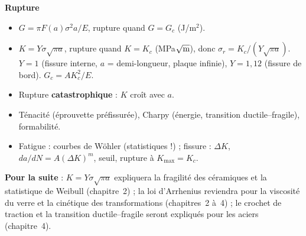 \begin{recapbox}
\textbf{Rupture}
\begin{itemize}
  \item $G = \pi F(a)\sigma^2 a/E$, rupture quand $G = G_c$ (J/m$^2$).
  \item \textbf{$K = Y\sigma\sqrt{\pi a}$}, rupture quand $K = K_c$ (MPa$\sqrt{\text m}$),
        donc $\sigma_r = K_c/(Y\sqrt{\pi a})$. $Y = 1$ (fissure interne, $a$ = demi-longueur,
        plaque infinie), $Y = 1{,}12$ (fissure de bord). $G_c = AK_c^2/E$.
  \item Rupture \textbf{catastrophique} : $K$ croît avec $a$.
  \item Ténacité (éprouvette préfissurée), Charpy (énergie, transition ductile--fragile),
        formabilité.
  \item Fatigue : courbes de Wöhler (statistiques !) ; fissure : $\Delta K$,
        $da/dN = A(\Delta K)^m$, seuil, rupture à $K_{\max} = K_c$.
\end{itemize}

\textbf{Pour la suite} : $K = Y\sigma\sqrt{\pi a}$ expliquera la fragilité des céramiques et la
statistique de Weibull (chapitre~2) ; la loi d'Arrhenius reviendra pour la viscosité du verre
et la cinétique des transformations (chapitres~2 à~4) ; le crochet de traction et la transition
ductile--fragile seront expliqués pour les aciers (chapitre~4).
\end{recapbox}
